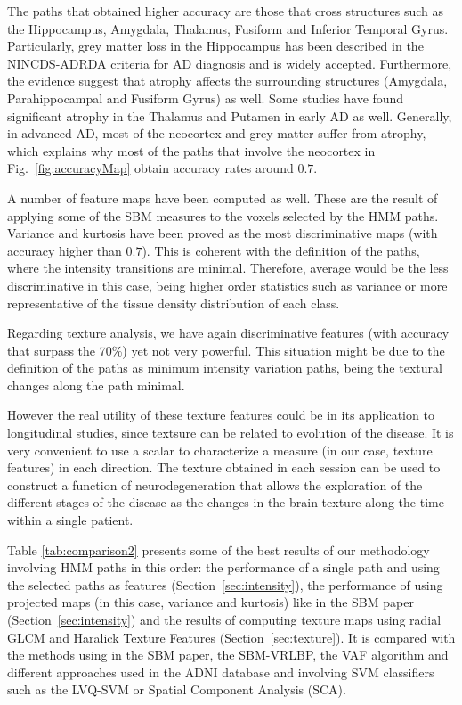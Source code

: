 The paths that obtained higher accuracy are those that cross structures such as the Hippocampus, Amygdala, Thalamus, Fusiform and Inferior Temporal Gyrus. Particularly, grey matter loss in the Hippocampus has been described in the NINCDS-ADRDA criteria for AD diagnosis\cite{Dubois2007} and is widely accepted\cite{chan2001patterns,Baron2001,Jong2008}. Furthermore, the evidence suggest that atrophy affects the surrounding structures (Amygdala, Parahippocampal and Fusiform Gyrus) as well\cite{chan2001patterns,Baron2001}. Some studies have found significant atrophy in the Thalamus and Putamen in early AD\cite{Jong2008} as well. Generally, in advanced AD, most of the neocortex and grey matter suffer from atrophy\cite{chan2001patterns,Baron2001,Jong2008}, which explains why most of the paths that involve the neocortex in Fig.~\ref{fig:accuracyMap} obtain accuracy rates around $0.7$. 

A number of feature maps have been computed as well. These are the result of applying some of the \ac{SBM} measures to the voxels selected by the \ac{HMM} paths. Variance and kurtosis have been proved as the most discriminative maps (with accuracy higher than $0.7$). This is coherent with the definition of the paths, where the intensity transitions are minimal. Therefore, average would be the less discriminative in this case, being higher order statistics such as variance or more representative of the tissue density distribution of each class. 

Regarding texture analysis, we have again discriminative features (with accuracy that surpass the 70\%) yet not very powerful. This situation might be due to the definition of the paths as minimum intensity variation paths, being the textural changes along the path minimal.  

However the real utility of these texture features could be in its application to longitudinal studies, since textsure can be related to evolution of the disease\cite{sikio2015mr}. It is very convenient to use a scalar to characterize a measure (in our case, texture features) in each direction. The texture obtained in each session can be used to construct a function of neurodegeneration that allows the exploration of the different stages of the disease as the changes in the brain texture along the time within a single patient. 

Table \ref{tab:comparison2} presents some of the best results of our methodology involving \ac{HMM} paths in this order: the performance of a single path and using the selected paths as features (Section~\ref{sec:intensity}), the performance of using projected maps (in this case, variance and kurtosis) like in the \ac{SBM} paper (Section~\ref{sec:intensity}) and the results of computing texture maps using radial GLCM and Haralick Texture Features (Section~\ref{sec:texture}). It is compared with the methods using in the \ac{SBM} paper\cite{Martinez-Murcia2015}, the \ac{SBM}-VRLBP\cite{Martinez-MurciaVRLBP}, the \acf{VAF}\cite{Stoeckel04} algorithm and different approaches used in the ADNI database and involving SVM classifiers such as the LVQ-SVM\cite{Ortiz2013} or Spatial Component Analysis (SCA)\cite{Illan2014}. 


